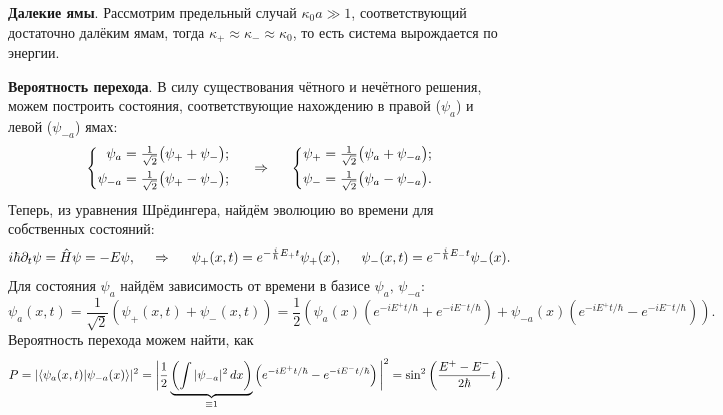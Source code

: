 \textbf{Далекие ямы}. Рассмотрим предельный случай $\kappa_0 a \gg 1$, соответствующий достаточно далёким ямам, тогда $\kappa_+ \approx \kappa_- \approx \kappa_0$, то есть система вырождается по энергии. 


\textbf{Вероятность перехода}. В силу существования чётного и нечётного решения, можем построить состояния, соответствующие нахождению в правой ($\psi_a$) и левой ($\psi_{-a}$) ямах:
\begin{equation*}
    \left\{\begin{aligned}
        \psi_a &= \tfrac{1}{\sqrt{2}} \big( \psi_+ + \psi_- \big); \\
        \psi_{-a} &= \tfrac{1}{\sqrt{2}} \big( \psi_+ - \psi_- \big);
    \end{aligned}\right.
    \hspace{0.5cm} \Rightarrow \hspace{0.5cm}
    \left\{\begin{aligned}
        \psi_+ &= \tfrac{1}{\sqrt{2}} \big( \psi_a + \psi_{-a} \big);\\
        \psi_- &= \tfrac{1}{\sqrt{2}} \big( \psi_a - \psi_{-a} \big).\\
    \end{aligned}\right.
\end{equation*}
Теперь, из уравнения Шрёдингера, найдём эволюцию во времени для собственных состояний:
\begin{equation*}
    i \hbar \partial_t \psi = \hat{H} \psi = - E \psi,
    \hspace{0.5cm} \Rightarrow \hspace{0.5cm}
    \psi_+ (x, t) = e^{- \frac{i}{\hbar} E_+ t} \psi_+(x),
    \hspace{5 mm} 
    \psi_- (x, t) = e^{- \frac{i}{\hbar} E_- t} \psi_-(x).
\end{equation*}
Для состояния $\psi_a$ найдём зависимость от времени в базисе $\psi_a,\, \psi_{-a}$:
\begin{equation*}
    \psi_a (x, t) = 
    \frac{1}{\sqrt{2}} (\psi_+(x, t) + \psi_- (x, t)) = 
    \frac{1}{2} \left(
        \psi_a(x) \left(
            e^{-i E^+ t / \hbar} + e^{- i E^- t / \hbar}
        \right) + \psi_{-a}(x) \left(
            e^{-i E^+ t / \hbar} - e^{-i E^- t / \hbar}
        \right)
    \right).
\end{equation*}
Вероятность перехода можем найти, как
\begin{equation*}   
    P = | \bk{\psi_{a}(x, t)}{\psi_{-a}(x)}|^2 = \bigg|
        \frac{1}{2} \underbrace{\left(
            \int |\psi_{-a}|^2 \d x
        \right)}_{\equiv 1} \left(
            e^{- i E^+ t / \hbar} - e^{-i E^- t / \hbar}
        \right)
    \bigg|^2 = \sin^2 \left(
        \frac{E^+ - E^-}{2 \hbar} t
    \right).
\end{equation*}

